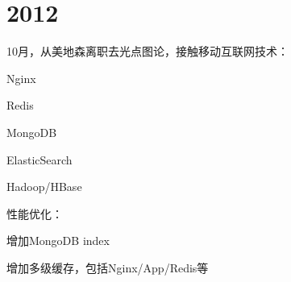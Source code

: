 \chapter{2012}

10月，从美地森离职去光点图论，接触移动互联网技术：

\begin{enumbox}
\item Nginx
\item Redis
\item MongoDB
\item ElasticSearch
\item Hadoop/HBase
\end{enumbox}

性能优化：
\begin{enumbox}
\item 增加MongoDB index
\item 增加多级缓存，包括Nginx/App/Redis等
\end{enumbox}
